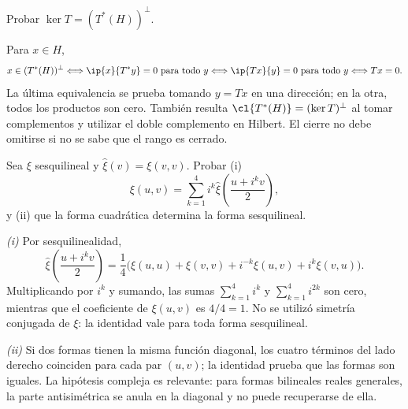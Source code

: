 \begin{ejercicio}\label{ej:lectura-32-8}
Probar $\ker T=(T^*(H))^{\perp}$.
\end{ejercicio}
\begin{solucion}
Para $x\in H$,
\[
 x\in(T^*(H))^{\perp}
 \Longleftrightarrow \ip{x}{T^*y}=0\text{ para todo }y
 \Longleftrightarrow \ip{Tx}{y}=0\text{ para todo }y
 \Longleftrightarrow Tx=0.
\]
La última equivalencia se prueba tomando $y=Tx$ en una dirección; en la otra, todos los productos son cero. También resulta $\cl{T^*(H)}=(\ker T)^{\perp}$ al tomar complementos y utilizar el doble complemento en Hilbert. El cierre no debe omitirse si no se sabe que el rango es cerrado.
\end{solucion}

\begin{ejercicio}\label{ej:lectura-32-9}
Sea $\xi$ sesquilineal y $\widehat\xi(v)=\xi(v,v)$. Probar (i)
\[
 \xi(u,v)=\sum_{k=1}^{4}i^k\widehat\xi\left(\frac{u+i^kv}{2}\right),
\]
y (ii) que la forma cuadrática determina la forma sesquilineal.
\end{ejercicio}
\begin{solucion}
\emph{(i)} Por sesquilinealidad,
\[
 \widehat\xi\left(\frac{u+i^kv}{2}\right)
 =\frac14\bigl(\xi(u,u)+\xi(v,v)+i^{-k}\xi(u,v)+i^k\xi(v,u)\bigr).
\]
Multiplicando por $i^k$ y sumando, las sumas $\sum_{k=1}^{4}i^k$ y $\sum_{k=1}^{4}i^{2k}$ son cero, mientras que el coeficiente de $\xi(u,v)$ es $4/4=1$. No se utilizó simetría conjugada de $\xi$: la identidad vale para toda forma sesquilineal.

\emph{(ii)} Si dos formas tienen la misma función diagonal, los cuatro términos del lado derecho coinciden para cada par $(u,v)$; la identidad prueba que las formas son iguales. La hipótesis compleja es relevante: para formas bilineales reales generales, la parte antisimétrica se anula en la diagonal y no puede recuperarse de ella.
\end{solucion}


